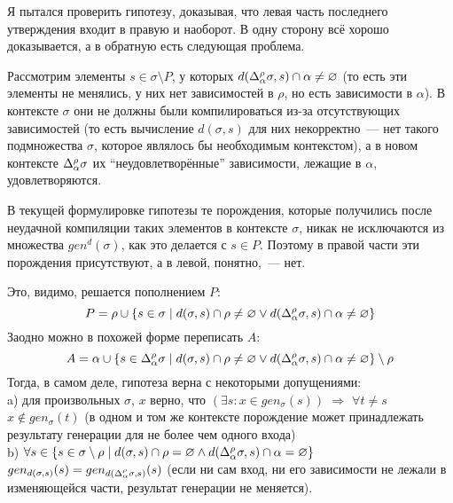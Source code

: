 





\hrulefill

Я пытался проверить гипотезу, доказывая, что левая часть последнего утверждения входит в правую и наоборот. В одну сторону всё хорошо доказывается, а в обратную есть следующая проблема.

Рассмотрим элементы $s \in \sigma \setminus P$, у которых $d(\Delta_\alpha^\rho\sigma, s) \cap \alpha \neq \varnothing$ (то есть эти элементы не менялись, у них нет зависимостей в $\rho$, но есть зависимости в $\alpha$). В контексте $\sigma$ они не должны были компилироваться из-за отсутствующих зависимостей (то есть вычисление $d(\sigma, s)$ для них некорректно~--- нет такого подмножества $\sigma$, которое являлось бы необходимым контекстом), а в новом контексте $\Delta_\alpha^\rho\sigma$ их ``неудовлетворённые'' зависимости, лежащие в $\alpha$, удовлетворяются.

В текущей формулировке гипотезы те порождения, которые получились после неудачной компиляции таких элементов в контексте $\sigma$, никак не исключаются из множества $gen^d(\sigma)$, как это делается с $s \in P$. Поэтому в правой части эти порождения присутствуют, а в левой, понятно,~--- нет.

Это, видимо, решается пополнением $P$:
$$P = \rho \cup \{ s \in \sigma \mid d(\sigma, s) \cap \rho \neq \varnothing \vee d(\Delta_\alpha^\rho\sigma, s) \cap \alpha \neq \varnothing \}$$
Заодно можно в похожей форме переписать $A$:
$$A = \alpha \cup \{ s \in \Delta_\alpha^\rho\sigma \mid d(\sigma, s) \cap \rho \neq \varnothing \vee d(\Delta_\alpha^\rho\sigma, s) \cap \alpha \neq \varnothing \} \setminus \rho$$
Тогда, в самом деле, гипотеза верна с некоторыми допущениями:\\
\indent a) для произвольных $\sigma$, $x$ верно, что $(\exists s: x \in gen_\sigma(s))$ $\Rightarrow$ $\forall t \neq s$ $x \notin gen_\sigma(t)$ (в одном и том же контексте порождение может принадлежать результату генерации для не более чем одного входа)\\
\indent b) $\forall s \in \{s \in \sigma \setminus \rho \mid d(\sigma, s) \cap \rho = \varnothing \wedge d(\Delta_\alpha^\rho\sigma, s) \cap \alpha = \varnothing \}$ $gen_{d(\sigma, s)} (s) = gen_{d(\Delta_\alpha^\rho\sigma, s)} (s)$ (если ни сам вход, ни его зависимости не лежали в изменяющейся части, результат генерации не меняется).\\

